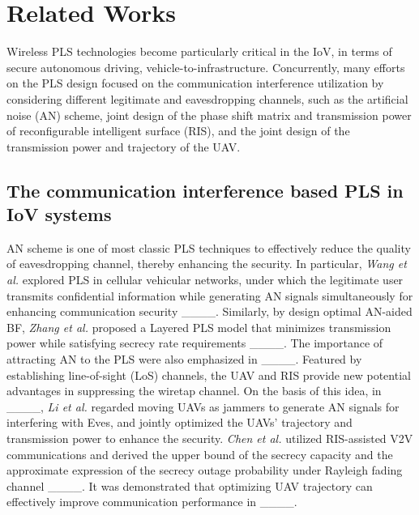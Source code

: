 \section{Related Works}
\label{sec:related work}


Wireless PLS technologies become particularly critical in the IoV, in terms of secure autonomous driving, vehicle-to-infrastructure. Concurrently, many efforts on the PLS design focused on the communication interference utilization by considering different legitimate and eavesdropping channels, such as the artificial noise (AN) scheme, joint design of the phase shift matrix and transmission power of reconfigurable intelligent surface (RIS), and the joint design of the transmission power and trajectory of the UAV.

\iffalse
\sout{Wireless PLS becomes particularly critical in the IoV, in terms of secure autonomous driving, vehicle-to-infrastructure communication, and emergency communication. Concurrently, many efforts on the PLS design focused on the communication interference utilization by considering different legitimate and eavesdropping channels. }From the perspective of communication interference utilization and trajectory optimization, the most representative methods includes AN-based BF design, joint design of the phase shift matrix and moving trajectory of IRS, joint design of the transmit power and trajectory of the UAV, and joint design of the BF and moving trajectory of the movable antenna (MA). 
\fi

\subsection{The communication interference based PLS in IoV systems}
AN scheme is one of most classic PLS techniques to effectively reduce the quality of eavesdropping channel, thereby enhancing the security.
In particular, \emph{Wang et al.} explored PLS in cellular vehicular networks, under which the legitimate user transmits confidential information while generating AN signals simultaneously for enhancing communication security ____. Similarly, by design optimal AN-aided BF, \emph{Zhang et al.} proposed a Layered PLS model that minimizes transmission power while satisfying secrecy rate requirements ____. The importance of attracting AN to the PLS were also emphasized in ____.
Featured by establishing line-of-sight (LoS) channels, the UAV and RIS provide new potential advantages in suppressing the wiretap channel. On the basis of this idea, in ____, \emph{Li et al.} regarded moving UAVs as jammers to generate AN signals for interfering with Eves, and jointly optimized the UAVs' trajectory and transmission power to enhance the security. \emph{Chen et al.} utilized RIS-assisted V2V communications and derived the upper bound of the secrecy capacity and the approximate expression of the secrecy outage probability under Rayleigh fading channel ____.
It was demonstrated that optimizing UAV trajectory can effectively improve communication performance in ____.

